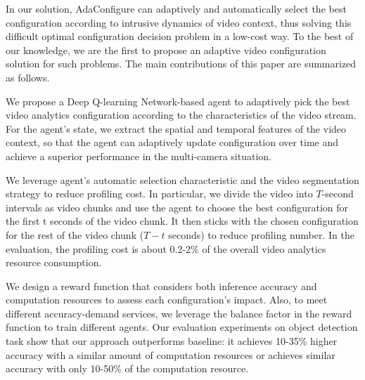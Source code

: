 In our solution, AdaConfigure can adaptively and automatically select the best configuration according to intrusive dynamics of video context, thus solving this difficult optimal configuration decision problem in a low-cost way. To the best of our knowledge, we are the first to propose an adaptive video configuration solution for such problems. 
The main contributions of this paper are summarized as follows. 

We propose a Deep Q-learning Network-based \cite{DQN} agent to adaptively pick the best video analytics configuration according to the characteristics of the video stream. For the agent's state, we extract the spatial and temporal features of the video context, so that the agent can adaptively update configuration over time and achieve a superior performance in the multi-camera situation. 

We leverage  agent's automatic selection characteristic and the video segmentation strategy to reduce profiling cost. In particular, we divide the video into $T$-second intervals as video chunks and use the agent to choose the best configuration for the first t seconds of the video chunk. It then sticks with the chosen configuration for the rest of the video chunk ($T-t$ seconds) to reduce profiling number. In the evaluation, the profiling cost is about 0.2-2\% of the overall video analytics resource consumption. 

We design a reward function that considers both inference accuracy and computation resources to assess each configuration's impact. Also, to meet different accuracy-demand services, we leverage the balance factor in the reward function to train different agents. Our evaluation experiments on object detection task show that our approach outperforms baseline: it achieves 10-35\% higher accuracy with a similar amount of computation resources or achieves similar accuracy with only 10-50\% of the computation resource.


